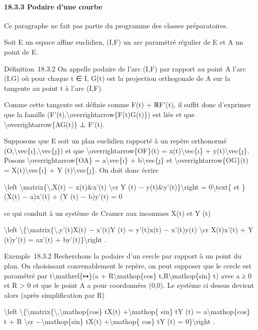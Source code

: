 \documentclass[]{article}
\begin{document}
\paragraph{18.3.3 Podaire d'une courbe}

Ce paragraphe ne fait pas partie du programme des classes préparatoires.

Soit E un espace affine euclidien, (I,F) un arc paramétré régulier de E
et A un point de E.

Définition~18.3.2 On appelle podaire de l'arc (I,F) par rapport au point
A l'arc (I,G) où pour chaque t ∈ I, G(t) est la projection orthogonale
de A sur la tangente au point t à l'arc (I,F).

Comme cette tangente est définie comme F(t) + ℝF'(t), il suffit donc
d'exprimer que la famille
(F'(t),\textbackslash{}overrightarrow\{F(t)G(t)\}) est liée et que
\textbackslash{}overrightarrow\{AG(t)\} ⊥ F'(t).

Supposons que E soit un plan euclidien rapporté à un repère orthonormé
(O,\textbackslash{}vec\{ı\},\textbackslash{}vec\{ȷ\}) et que
\textbackslash{}overrightarrow\{OF\}(t) = x(t)\textbackslash{}vec\{ı\} +
y(t)\textbackslash{}vec\{ȷ\}. Posons
\textbackslash{}overrightarrow\{OA\} = a\textbackslash{}vec\{ı\} +
b\textbackslash{}vec\{ȷ\} et \textbackslash{}overrightarrow\{OG\}(t) =
X(t)\textbackslash{}vec\{ı\} + Y (t)\textbackslash{}vec\{ȷ\}. On doit
donc écrire

\textbackslash{}left
\textbar{}\textbackslash{}matrix\{\textbackslash{},X(t) − x(t)\&x'(t)
\textbackslash{}cr Y (t) − y(t)\&y'(t)\}\textbackslash{}right \textbar{}
= 0\textbackslash{}text\{ et \}(X(t) − a)x'(t) + (Y (t) − b)y'(t) = 0

ce qui conduit à un système de Cramer aux inconnues X(t) et Y (t)

\textbackslash{}left
\textbackslash{}\{\textbackslash{}matrix\{\textbackslash{},y'(t)X(t) −
x'(t)Y (t) = y'(t)x(t) − x'(t)y(t) \textbackslash{}cr X(t)x'(t) + Y
(t)y'(t) = ax'(t) + by'(t)\}\textbackslash{}right .

Exemple~18.3.2 Recherchons la podaire d'un cercle par rapport à un point
du plan. On choisissant convenablement le repère, on peut supposer que
le cercle est paramétré par t\textbackslash{}mathrel\{↦\}(a +
R\textbackslash{}mathop\{cos\} t,R\textbackslash{}mathop\{sin\} t) avec
a ≥ 0 et R \textgreater{} 0 et que le point A a pour coordonnées (0,0).
Le système ci dessus devient alors (après simplification par R)

\textbackslash{}left
\textbackslash{}\{\textbackslash{}matrix\{\textbackslash{},\textbackslash{}mathop\{cos\}
tX(t) +\textbackslash{}mathop\{ sin\} tY (t) =
a\textbackslash{}mathop\{cos\} t + R \textbackslash{}cr
−\textbackslash{}mathop\{sin\} tX(t) +\textbackslash{}mathop\{ cos\} tY
(t) = 0\}\textbackslash{}right .
\end{document}
